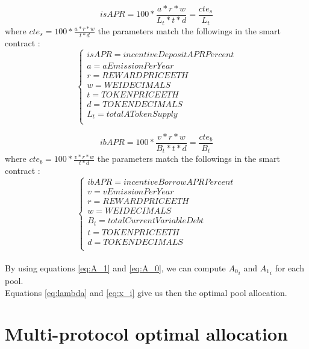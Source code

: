 \documentclass[conference]{IEEEtran}
\begin{document}
\begin{equation}
 isAPR=100 *\frac{a*r*w}{L_t*t*d} =\frac{cte_s}{L_t}
\end{equation}
where $cte_s = 100 *\frac{a*r*w}{t*d}$ the parameters match the followings in the smart contract :\\
$$
\left\{
\begin{array}{c}
  isAPR=incentiveDepositAPRPercent\\
  a=aEmissionPerYear\\
  r=REWARDPRICEETH \\
  w=WEIDECIMALS\\
  t=TOKENPRICEETH \\
  d=TOKENDECIMALS\\
  L_t =totalATokenSupply\\
\end{array}
\right.
$$

\begin{equation}\label{eq:ibAPR}
 ibAPR=100 *\frac{v *r*w}{B_t*t*d}=\frac{cte_b}{B_t} 
\end{equation}
where $cte_b = 100 *\frac{v *r*w}{t*d}$ the parameters match the followings in the smart contract :\\
$$
\left\{
\begin{array}{c}
  ibAPR=incentiveBorrowAPRPercent\\
  v=vEmissionPerYear\\
  r=REWARDPRICEETH \\
  w=WEIDECIMALS\\
  B_t=totalCurrentVariableDebt\\
  t=TOKENPRICEETH \\
  d=TOKENDECIMALS\\
\end{array}
\right.
$$\\

By using equations \ref{eq:A_1} and \ref{eq:A_0}, we can compute ${A_0}_i$ and ${A_1}_i$ for each pool. \\
Equations \ref{eq:lambda} and \ref{eq:x_i} give us then the optimal pool allocation.\\

\section{Multi-protocol optimal allocation}
\end{document}
